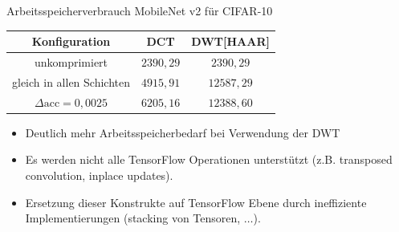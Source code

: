 \documentclass[aspectratio=169, 12pt]{beamer}
\begin{document}
\begin{frame}{Arbeitsspeicherverbrauch MobileNet v2 für CIFAR-10}
  \begin{table}[H]
    \centering
    \begin{tabular}{|c|c|c|}
        \hline
        \textbf{Konfiguration}          & \textbf{DCT} & \textbf{DWT{[}HAAR{]}} \\ \hline
        unkomprimiert               & $2390{,}29$  & $2390{,}29$            \\ \hline
        gleich in allen Schichten   & $4915{,}91$  & $12587{,}29$           \\ \hline
        $\Delta\text{acc}=0{,}0025$ & $6205{,}16$  & $12388{,}60$           \\ \hline
        \end{tabular}
\end{table}  
\pause
\begin{itemize}
  \item Deutlich mehr Arbeitsspeicherbedarf bei Verwendung der DWT
  \item Es werden nicht alle TensorFlow Operationen unterstützt (z.B. transposed convolution, inplace updates).
  \item Ersetzung dieser Konstrukte auf TensorFlow Ebene durch ineffiziente Implementierungen (stacking von Tensoren, $\ldots$).
\end{itemize}
\end{frame}
\end{document}
